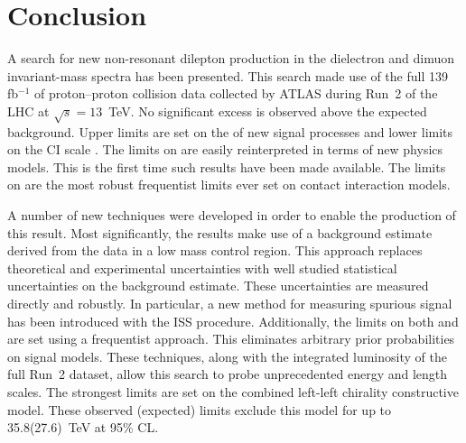 \section{Conclusion}\label{sec:ciConclusion}


A search for new non-resonant dilepton production in the dielectron and dimuon invariant-mass spectra has been presented.
This search made use of the full 139 fb$^{-1}$ of proton--proton collision data collected by ATLAS during Run~2 of the LHC at $\sqrt{s}=13$~TeV.
No significant excess is observed above the expected background.
Upper limits are set on the \xsbr of new signal processes and lower limits on the CI scale \lam.
The limits on \xsbr are easily reinterpreted in terms of new physics models.
This is the first time such results have been made available.
The limits on \lam are the most robust frequentist limits ever set on contact interaction models.

A number of new techniques were developed in order to enable the production of this result.
Most significantly, the results make use of a background estimate derived from the data in a low mass control region.
This approach replaces theoretical and experimental uncertainties with well studied statistical uncertainties on the background estimate.
These uncertainties are measured directly and robustly.
In particular, a new method for measuring spurious signal has been introduced with the ISS procedure.
Additionally, the limits on both \xsbr and \lam are set using a frequentist approach.
This eliminates arbitrary prior probabilities on signal models.
These techniques, along with the integrated luminosity of the full Run~2 dataset, allow this search to probe unprecedented energy and length scales.
The strongest limits are set on the combined left-left chirality constructive model.
These observed (expected) limits exclude this model for \lam up to 35.8(27.6)~TeV at 95\% CL.

